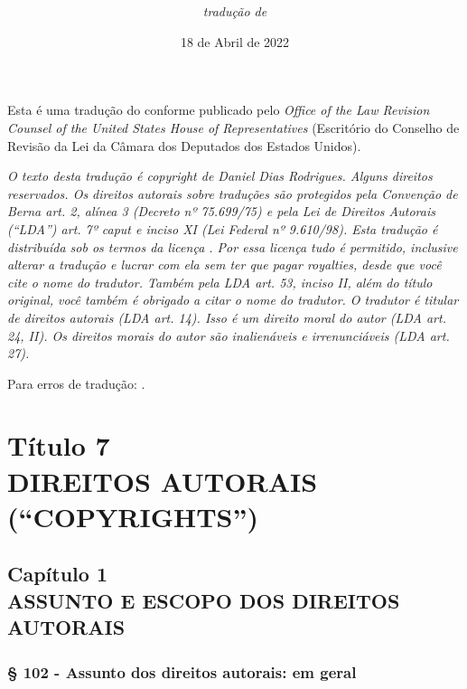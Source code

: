 \documentclass[a5paper,10pt]{book}
\title{\textbf{\titulo}}
\author{\textit{tradução de}\\\autor}
\date{18 de Abril de 2022}
\newcommand{\sublinhado}[1]{\underline{\smash{#1}}}
\begin{document}
\maketitle

Esta é uma tradução do \href{https://uscode.house.gov}{\sublinhado{United States Code}} conforme publicado pelo \textit{Office of the Law Revision Counsel of the United States House of Representatives} (Escritório do Conselho de Revisão da Lei da Câmara dos Deputados dos Estados Unidos).

\textit{O texto desta tradução é copyright  de Daniel Dias Rodrigues. Alguns direitos reservados. Os direitos autorais sobre traduções são protegidos pela Convenção de Berna art. 2, alínea 3 (Decreto nº 75.699/75) e pela Lei de Direitos Autorais (``LDA'') art. 7º caput e inciso XI (Lei Federal nº 9.610/98). Esta tradução é distribuída sob os termos da licença \href{https://creativecommons.org/licenses/by/4.0/deed.pt_BR}{\underline{}}. Por essa licença tudo é permitido, inclusive alterar a tradução e lucrar com ela sem ter que pagar royalties, desde que você cite o nome do tradutor. Também pela LDA art. 53, inciso II, além do título original, você também é obrigado a citar o nome do tradutor. O tradutor é titular de direitos autorais (LDA art. 14). Isso é um direito moral do autor (LDA art. 24, II). Os direitos morais do autor são inalienáveis e irrenunciáveis (LDA art. 27).}

Para erros de tradução: \href{mailto:danieldiasr@gmail.com}{\underline{}}.

\tableofcontents

\part[TÍT. 7 -- DIREITOS AUTORAIS (``COPYRIGHTS'')]{Título 7\\ DIREITOS AUTORAIS (``COPYRIGHTS'')}

\chapter[Cap. 1 -- ASSUNTO E ESCOPO DOS DIREITOS AUTORAIS]{Capítulo 1\\ ASSUNTO E ESCOPO DOS DIREITOS AUTORAIS}

\section{§ 102 - Assunto dos direitos autorais: em geral}
\end{document}
